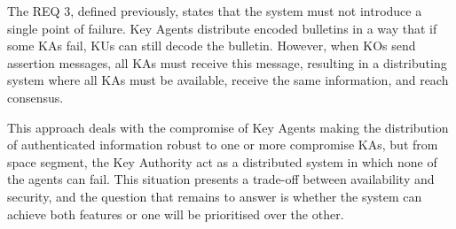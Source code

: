 The REQ 3, defined previously, states that the system must not introduce a single point of failure. Key Agents distribute encoded bulletins in a way that if some KAs fail, KUs can still decode the bulletin. However, when KOs send assertion messages, all KAs must receive this message, resulting in a distributing system where all KAs must be available, receive the same information, and reach consensus.

This approach deals with the compromise of Key Agents making the distribution of authenticated information robust to one or more compromise KAs, but from space segment, the Key Authority act as a distributed system in which none of the agents can fail. This situation presents a trade-off between availability and security, and the question that remains to answer is whether the system can achieve both features or one will be prioritised over the other. 


 